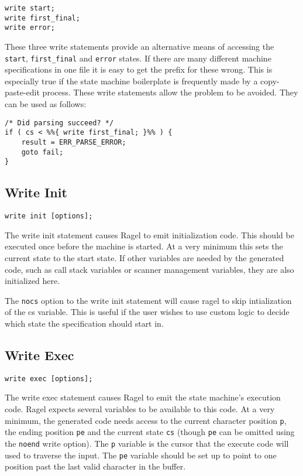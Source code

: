 \documentclass[letterpaper,11pt,oneside]{book}
\newcommand{\verbspace}{\vspace{10pt}}
\begin{document}
\begin{verbatim}
write start;
write first_final;
write error;
\end{verbatim}
\verbspace

These three write statements provide an alternative means of accessing the
\verb|start|, \verb|first_final| and \verb|error| states. If there are many
different machine specifications in one file it is easy to get the prefix for
these wrong. This is especially true if the state machine boilerplate is
frequently made by a copy-paste-edit process. These write statements allow the
problem to be avoided. They can be used as follows:

\begin{verbatim}
/* Did parsing succeed? */
if ( cs < %%{ write first_final; }%% ) {
    result = ERR_PARSE_ERROR;
    goto fail;
}
\end{verbatim}
\verbspace

\subsection{Write Init}
\begin{verbatim}
write init [options];
\end{verbatim}
\verbspace

The write init statement causes Ragel to emit initialization code. This should
be executed once before the machine is started. At a very minimum this sets the
current state to the start state. If other variables are needed by the
generated code, such as call stack variables or scanner management
variables, they are also initialized here.

The \verb|nocs| option to the write init statement will cause ragel to skip
intialization of the cs variable. This is useful if the user wishes to use
custom logic to decide which state the specification should start in.

\subsection{Write Exec}
\begin{verbatim}
write exec [options];
\end{verbatim}
\verbspace

The write exec statement causes Ragel to emit the state machine's execution code.
Ragel expects several variables to be available to this code. At a very minimum, the
generated code needs access to the current character position \verb|p|, the ending
position \verb|pe| and the current state \verb|cs| (though \verb|pe|
can be omitted using the \verb|noend| write option).
The \verb|p| variable is the cursor that the execute code will
used to traverse the input. The \verb|pe| variable should be set up to point to one
position past the last valid character in the buffer.
\end{document}
